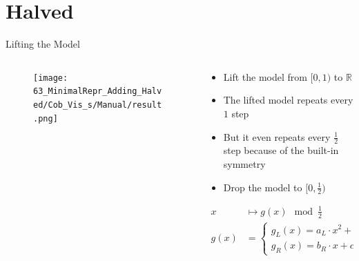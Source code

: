 \section{Halved}

\begin{frame}{Lifting the Model}
	\vspace{-1em}
	\begin{columns}
		\begin{column}{.4 \textwidth}
			\begin{figure}
				\texttt{[image: 63\_MinimalRepr\_Adding\_Halved/Cob\_Vis\_s/Manual/result.png]}
			\end{figure}
		\end{column}
		\begin{column}{.5 \textwidth}
			\pause
			\begin{itemize}
				\item Lift the model from $[0, 1)$ to $\mathbb{R}$ \pause
				\item The lifted model repeats every $1$ step \pause
				\item But it even repeats every $\frac{1}{2}$ step because of the built-in symmetry \pause
				\item Drop the model to $[0, \frac{1}{2})$ \pause
			\end{itemize}
			\begin{align*}
				x    & \mapsto g(x) \mod \frac{1}{2}                                              \\
				g(x) & = \begin{cases}
					         g_L(x) = a_L \cdot x^2 + b_L \cdot x + c_L & \text{ if } x < \frac{1}{4} \\
					         g_R(x) = b_R \cdot x + c_R                 & \text{ else}
				         \end{cases}
			\end{align*}
		\end{column}
	\end{columns}
\end{frame}

